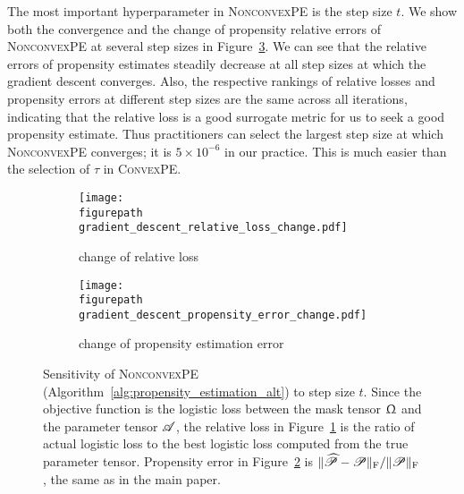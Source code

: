 \documentclass{article}
\newcommand{\T}[2][]{#1\mathscr{\MakeUppercase{#2}}}
\newcommand{\norm}[1]{\Vert #1 \Vert}
\newcommand{\fnorm}[1]{\norm{#1}_{\mathrm{F}}}
\theoremstyle{plain}
\def \figurepath {figures/}
\begin{document}
The most important hyperparameter in \textsc{NonconvexPE} is the step size $t$.
We show both the convergence and the change of propensity relative errors of \textsc{NonconvexPE} at several step sizes in Figure~\ref{fig:gd-hyperparameter-sensitivity}.
We can see that the relative errors of propensity estimates steadily decrease at all step sizes at which the gradient descent converges.
Also, the respective rankings of relative losses and propensity errors at different step sizes are the same across all iterations, indicating that the relative loss is a good surrogate metric for us to seek a good propensity estimate. 
Thus practitioners can select the largest step size at which \textsc{NonconvexPE} converges; it is $5 \times 10^{-6}$ in our practice.
This is much easier than the selection of $\tau$ in \textsc{ConvexPE}. 

\begin{figure}
\centering
\begin{minipage}[b]{0.75\linewidth}		
\begin{subfigure}[t]{.45\linewidth}
\texttt{[image: \\figurepath gradient\_descent\_relative\_loss\_change.pdf]}
\caption{change of relative loss}
\label{fig:gd-hyperparameter-sensitivity-loss}
\end{subfigure}
	\hspace{.03\linewidth}	
\begin{subfigure}[t]{.45\linewidth}
\texttt{[image: \\figurepath gradient\_descent\_propensity\_error\_change.pdf]}
\caption{change of propensity estimation error}
\label{fig:gd-hyperparameter-sensitivity-error}
\end{subfigure}
\end{minipage}
\begin{minipage}[b]{.16\linewidth}
\end{minipage}
	
	\caption{Sensitivity of \textsc{NonconvexPE} (Algorithm~\ref{alg:propensity_estimation_alt}) to step size $t$.
		Since the objective function is the logistic loss between the mask tensor $\Upomega$ and the parameter tensor $\T{A}$, the relative loss in Figure~\ref{fig:gd-hyperparameter-sensitivity-loss} is the ratio of actual logistic loss to the best logistic loss computed from the true parameter tensor.
		Propensity error in Figure~\ref{fig:gd-hyperparameter-sensitivity-error} is $\fnorm{\widehat{\T{P}} - \T{P}} / \fnorm{\T{P}}$, the same as in the main paper.}
	\label{fig:gd-hyperparameter-sensitivity}
\end{figure}
\end{document}
